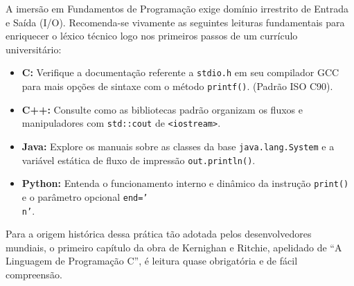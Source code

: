 \documentclass{article}
\begin{document}
\begin{notebox}
A imersão em Fundamentos de Programação exige domínio irrestrito de Entrada e Saída (I/O). Recomenda-se vivamente as seguintes leituras fundamentais para enriquecer o léxico técnico logo nos primeiros passos de um currículo universitário:

\begin{itemize}
    \item \textbf{C:} Verifique a documentação referente a \texttt{stdio.h} em seu compilador GCC para mais opções de sintaxe com o método \texttt{printf()}. (Padrão ISO C90).
    \item \textbf{C++:} Consulte como as bibliotecas padrão organizam os fluxos e manipuladores com \texttt{std::cout} de \texttt{<iostream>}.
    \item \textbf{Java:} Explore os manuais sobre as classes da base \texttt{java.lang.System} e a variável estática de fluxo de impressão \texttt{out.println()}.
    \item \textbf{Python:} Entenda o funcionamento interno e dinâmico da instrução \texttt{print()} e o parâmetro opcional \texttt{end='\\n'}.
\end{itemize}

Para a origem histórica dessa prática tão adotada pelos desenvolvedores mundiais, o primeiro capítulo da obra de Kernighan e Ritchie, apelidado de ``A Linguagem de Programação C'', é leitura quase obrigatória e de fácil compreensão.
\end{notebox}

\vspace{2cm}

\end{document}
